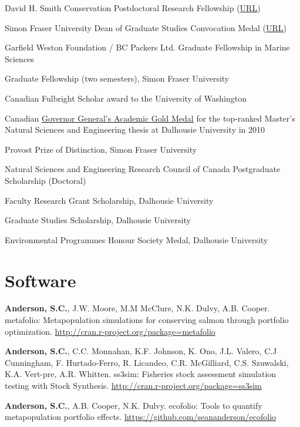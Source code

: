 \begin{description}
\tightlist
\item[2015]
David H. Smith Conservation Postdoctoral Research Fellowship
(\href{http://conbio.org/mini-sites/smith-fellows/meet-the-fellows/2015-fellows/sean-anderson}{URL})
\item[2015]
Simon Fraser University Dean of Graduate Studies Convocation Medal
(\href{https://www.sfu.ca/dean-gradstudies/blog/year/2015/06/SeanAnderson.html}{URL})
\item[2014]
Garfield Weston Foundation / BC Packers Ltd. Graduate Fellowship in
Marine Sciences
\item[2014]
Graduate Fellowship (two semesters), Simon Fraser University
\item[2012--13]
Canadian Fulbright Scholar award to the University of Washington
\item[2011]
Canadian \href{http://goo.gl/nA1zE}{Governor General's Academic Gold
Medal} for the top-ranked Master's Natural Sciences and Engineering
thesis at Dalhousie University in 2010
\item[2011--14]
Provost Prize of Distinction, Simon Fraser University
\item[2011--14]
Natural Sciences and Engineering Research Council of Canada Postgraduate
Scholarship (Doctoral)
\item[2007--10]
Faculty Research Grant Scholarship, Dalhousie University
\item[2007--09]
Graduate Studies Scholarship, Dalhousie University
\item[2007]
Environmental Programmes Honour Society Medal, Dalhousie University
\end{description}

\section{Software}\label{software}

\begin{description}
\tightlist
\item[2014]
\textbf{Anderson, S.C.}, J.W. Moore, M.M McClure, N.K. Dulvy, A.B.
Cooper.\\
metafolio: Metapopulation simulations for conserving salmon through
portfolio optimization.
\url{http://cran.r-project.org/package=metafolio}
\item[2013]
\textbf{Anderson, S.C.}, C.C. Monnahan, K.F. Johnson, K. Ono, J.L.
Valero, C.J Cunningham, F. Hurtado-Ferro, R. Licandeo, C.R. McGilliard,
C.S. Szuwalski, K.A. Vert-pre, A.R. Whitten. ss3sim: Fisheries stock
assessment simulation testing with Stock Synthesis.
\url{http://cran.r-project.org/package=ss3sim}
\item[2013]
\textbf{Anderson, S.C.}, A.B. Cooper, N.K. Dulvy. ecofolio: Tools to
quantify metapopulation portfolio effects.
\url{https://github.com/seananderson/ecofolio}
\end{description}

